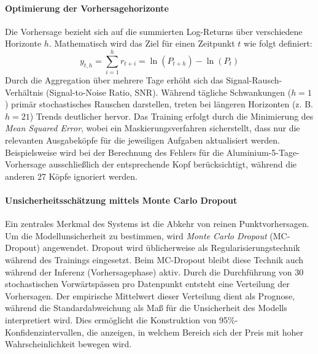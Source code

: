 \paragraph{Optimierung der Vorhersagehorizonte}
Die Vorhersage bezieht sich auf die summierten Log-Returns über verschiedene Horizonte $h$. Mathematisch wird das Ziel für einen Zeitpunkt $t$ wie folgt definiert:
\begin{equation}
    y_{t,h} = \sum_{i=1}^{h} r_{t+i} = \ln(P_{t+h}) - \ln(P_t)
\end{equation}
Durch die Aggregation über mehrere Tage erhöht sich das Signal-Rausch-Verhältnis (Signal-to-Noise Ratio, SNR). Während tägliche Schwankungen ($h=1$) primär stochastisches Rauschen darstellen, treten bei längeren Horizonten (z. B. $h=21$) Trends deutlicher hervor. Das Training erfolgt durch die Minimierung des \emph{Mean Squared Error}, wobei ein Maskierungsverfahren sicherstellt, dass nur die relevanten Ausgabeköpfe für die jeweiligen Aufgaben aktualisiert werden. Beispielsweise wird bei der Berechnung des Fehlers für die Aluminium-5-Tage-Vorhersage ausschließlich der entsprechende Kopf berücksichtigt, während die anderen 27 Köpfe ignoriert werden.

\paragraph{Unsicherheitsschätzung mittels Monte Carlo Dropout}
Ein zentrales Merkmal des Systems ist die Abkehr von reinen Punktvorhersagen. Um die Modellunsicherheit zu bestimmen, wird \emph{Monte Carlo Dropout} (MC-Dropout) angewendet. Dropout wird üblicherweise als Regularisierungstechnik während des Trainings eingesetzt. Beim MC-Dropout bleibt diese Technik auch während der Inferenz (Vorhersagephase) aktiv. Durch die Durchführung von 30 stochastischen Vorwärtspässen pro Datenpunkt entsteht eine Verteilung der Vorhersagen. Der empirische Mittelwert dieser Verteilung dient als Prognose, während die Standardabweichung als Maß für die Unsicherheit des Modells interpretiert wird. Dies ermöglicht die Konstruktion von 95\%-Konfidenzintervallen, die anzeigen, in welchem Bereich sich der Preis mit hoher Wahrscheinlichkeit bewegen wird.
